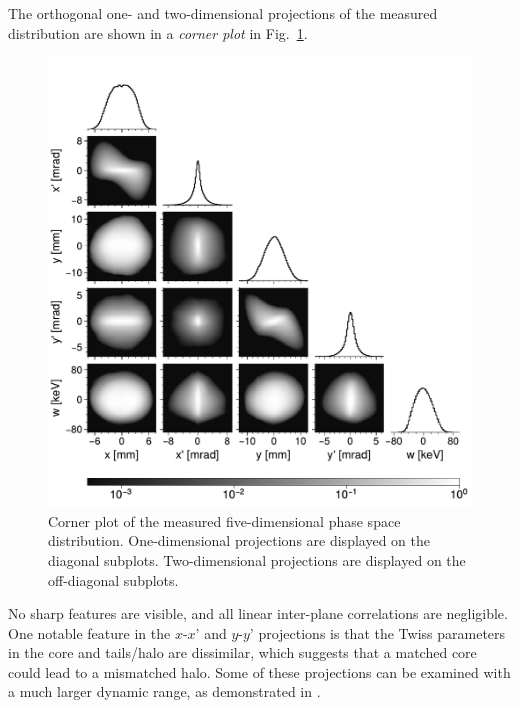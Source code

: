 \documentclass[%
 reprint,
nofootinbib,
 amsmath,amssymb,
 aps,
prstab,
]{revtex4-2}
\begin{document}
The orthogonal one- and two-dimensional projections of the measured distribution are shown in a \textit{corner plot} in Fig.~\ref{fig:corner}.
%
\begin{figure}[]
    \centering
    \includegraphics[width=1.0\columnwidth]{fig_corner.pdf}
    \caption{Corner plot of the measured five-dimensional phase space distribution. One-dimensional projections are displayed on the diagonal subplots. Two-dimensional projections are displayed on the off-diagonal subplots.}
    \label{fig:corner}
\end{figure}
%
No sharp features are visible, and all linear inter-plane correlations are negligible. One notable feature in the $x$-$x’$ and $y$-$y’$ projections is that the Twiss parameters in the core and tails/halo are dissimilar, which suggests that a matched core could lead to a mismatched halo. Some of these projections can be examined with a much larger dynamic range, as demonstrated in \cite{Aleksandrov2021}.
\end{document}

